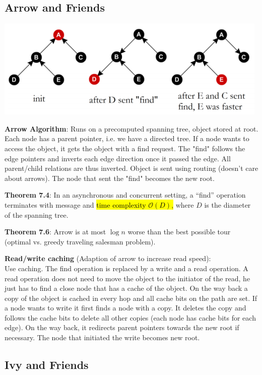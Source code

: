 \documentclass[a4paper, 8pt, landscape]{scrartcl}
\begin{document}
\begin{multicols*}{3}
\subsection{Arrow and Friends}

\begin{center}
\includegraphics[width=0.7\columnwidth]{source/arrow}
\end{center}


\textbf{Arrow Algorithm}: Runs on a precomputed spanning tree, object stored at root. Each node has a parent pointer, i.e. we have a directed tree. If a node wants to access the object, it gets the object with a find request. The "find" follows the edge pointers and inverts each edge direction once it passed the edge.  All parent/child relations are thus inverted. Object is sent using routing (doesn’t care about arrows). The node that sent the "find" becomes the new root.

\textbf{Theorem 7.4}: In an asynchronous and concurrent setting, a “find” operation terminates with message and \hl{time complexity $\mathcal{O}(D)$,} where $D$ is the diameter of the spanning tree.

\textbf{Theorem 7.6}: Arrow is at most $\log n$ worse than the best possible tour (optimal vs. greedy traveling salesman problem).

\textbf{Read/write caching} (Adaption of arrow to increase read speed):\\
Use caching. The find operation is replaced by a write and a read operation. A read operation does not need to move the object to the initiator of the read, he just has to find a close node that has a cache of the object. On the way back a copy of the object is cached in every hop and all cache bits on the path are set. If a node wants to write it first finds a node with a copy. It deletes the copy and follows the cache bits to delete all other copies (each node has cache bits for each edge). On the way back, it redirects parent pointers towards the new root if necessary. The node that initiated the write becomes new root.


\subsection{Ivy and Friends}


\end{multicols*}
\end{document}
